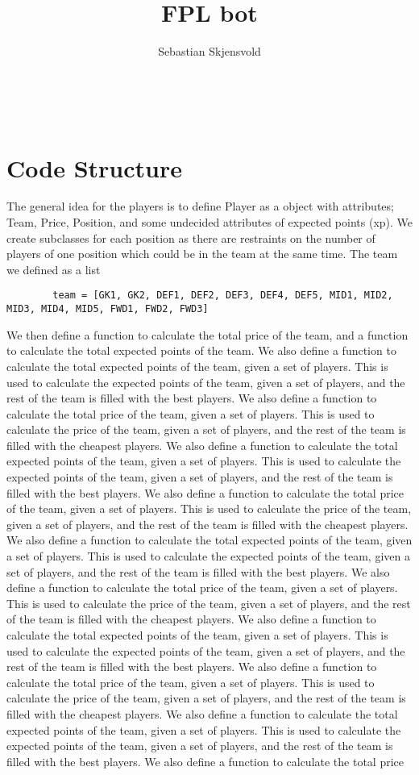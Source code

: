 \documentclass{article}
\title{FPL bot}
\author{Sebastian Skjensvold}
\newcommand{\pb}{\pagebreak \\ \noindent}
\begin{document}
	\maketitle
	\noindent
	\tableofcontents
	\pb
		\section{Code Structure}
		The general idea for the players is to define Player as a object with attributes; Team, Price, Position, and some undecided attributes of expected points (xp). We create subclasses for each position as there are restraints on the number of players of one position which could be in the team at the same time. The team we defined as a list 
		\begin{verbatim}
		team = [GK1, GK2, DEF1, DEF2, DEF3, DEF4, DEF5, MID1, MID2, MID3, MID4, MID5, FWD1, FWD2, FWD3]
		\end{verbatim}
		We then define a function to calculate the total price of the team, and a function to calculate the total expected points of the team. We also define a function to calculate the total expected points of the team, given a set of players. This is used to calculate the expected points of the team, given a set of players, and the rest of the team is filled with the best players. We also define a function to calculate the total price of the team, given a set of players. This is used to calculate the price of the team, given a set of players, and the rest of the team is filled with the cheapest players. We also define a function to calculate the total expected points of the team, given a set of players. This is used to calculate the expected points of the team, given a set of players, and the rest of the team is filled with the best players. We also define a function to calculate the total price of the team, given a set of players. This is used to calculate the price of the team, given a set of players, and the rest of the team is filled with the cheapest players. We also define a function to calculate the total expected points of the team, given a set of players. This is used to calculate the expected points of the team, given a set of players, and the rest of the team is filled with the best players. We also define a function to calculate the total price of the team, given a set of players. This is used to calculate the price of the team, given a set of players, and the rest of the team is filled with the cheapest players. We also define a function to calculate the total expected points of the team, given a set of players. This is used to calculate the expected points of the team, given a set of players, and the rest of the team is filled with the best players. We also define a function to calculate the total price of the team, given a set of players. This is used to calculate the price of the team, given a set of players, and the rest of the team is filled with the cheapest players. We also define a function to calculate the total expected points of the team, given a set of players. This is used to calculate the expected points of the team, given a set of players, and the rest of the team is filled with the best players. We also define a function to calculate the total price
\end{document}

